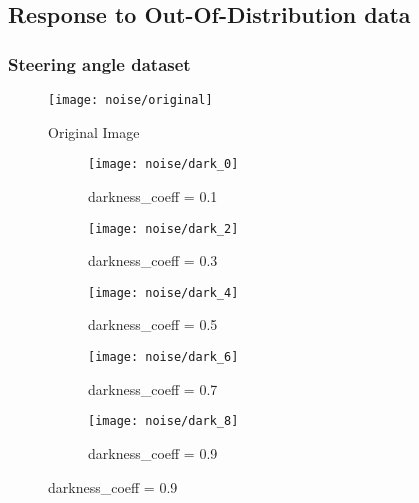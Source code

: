 \subsection {Response to Out-Of-Distribution data}
\subsubsection{Steering angle dataset}
\begin{figure}[H]
	\centering
	\texttt{[image: noise/original]}
	\caption{Original Image}
	\label{fig_original_noise}
	\hfill
\end{figure}
\begin{figure}[H]
	\centering
	\begin{subfigure}[b]{0.18\textwidth}
		\centering
		\texttt{[image: noise/dark\_0]}
		\caption{darkness\_coeff = 0.1}
		\label{mcdo_fn2}
	\end{subfigure}
	\hfill
	\begin{subfigure}[b]{0.18\textwidth}
		\centering
		\texttt{[image: noise/dark\_2]}
		\caption{darkness\_coeff = 0.3}
		\label{der_fn2}
	\end{subfigure}
	\hfill
	\begin{subfigure}[b]{0.18\textwidth}
		\centering
		\texttt{[image: noise/dark\_4]}
		\caption{darkness\_coeff = 0.5}
		\label{homo_fn3}
	\end{subfigure}
	\hfill
	\begin{subfigure}[b]{0.18\textwidth}
		\centering
		\texttt{[image: noise/dark\_6]}
		\caption{darkness\_coeff = 0.7}
		\label{hetero_fn3}
	\end{subfigure}
	\hfill
	\begin{subfigure}[b]{0.18\textwidth}
		\centering
		\texttt{[image: noise/dark\_8]}
		\caption{darkness\_coeff = 0.9}
		\label{mcdo_fn3}
	\end{subfigure}
	\hfill
	\label{fig_noise_dark}
\end{figure}
